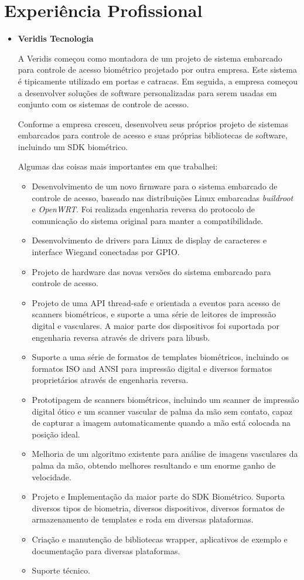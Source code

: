 \documentclass[a4paper,10pt]{article}
\begin{document}
  \section{Experiência Profissional}
    \begin{itemize}
      \item  
        \textbf{Veridis Tecnologia}

        A Veridis começou como montadora de um projeto de sistema embarcado para controle de acesso biométrico projetado por outra empresa. Este sistema é tipicamente utilizado em portas e catracas. Em seguida, a empresa começou a desenvolver soluções de software personalizadas para serem usadas em conjunto com os sistemas de controle de acesso.

        Conforme a empresa cresceu, desenvolveu seus próprios projeto de sistemas embarcados para controle de acesso e suas próprias bibliotecas de software, incluindo um SDK biométrico.

        Algumas das coisas mais importantes em que trabalhei:
        \begin{itemize}
          \item Desenvolvimento de um novo firmware para o sistema embarcado de controle de acesso, baseado nas distribuições Linux embarcadas \emph{buildroot} e \emph{OpenWRT}. Foi realizada engenharia reversa do protocolo de comunicação do sistema original para manter a compatibilidade.
	  \item Desenvolvimento de drivers para Linux de display de caracteres e interface Wiegand conectadas por GPIO.
	  \item Projeto de hardware das novas versões do sistema embarcado para controle de acesso.
          \item Projeto de uma API thread-safe e orientada a eventos para acesso de scanners biométricos, e suporte a uma série de leitores de impressão digital e vasculares. A maior parte dos dispositivos foi suportada por engenharia reversa através de drivers para libusb.
          \item Suporte a uma série de formatos de templates biométricos, incluindo os formatos ISO and ANSI para impressão digital e diversos formatos proprietários através de engenharia reversa.
          \item Prototipagem de scanners biométricos, incluindo um scanner de impressão digital ótico e um scanner vascular de palma da mão sem contato, capaz de capturar a imagem automaticamente quando a mão está colocada na posição ideal.
          \item Melhoria de um algoritmo existente para análise de imagens vasculares da palma da mão, obtendo melhores resultando e um enorme ganho de velocidade.
          \item Projeto e Implementação da maior parte do SDK Biométrico. Suporta diversos tipos de biometria, diversos dispositivos, diversos formatos de armazenamento de templates e roda em diversas plataformas.
          \item Criação e manutenção de bibliotecas wrapper, aplicativos de exemplo e documentação para diversas plataformas.
          \item Suporte técnico.
        \end{itemize}


\end{itemize}
\end{document}
